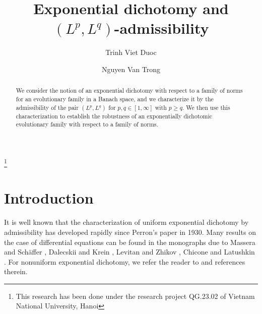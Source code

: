 \documentclass[reqno]{amsart}
\begin{document}
\title[Exponential dichotomy and admissibility]{Exponential dichotomy and $(L^p,L^q)$-admissibility} 
         
\thanks{This research has been done under the research project QG.23.02 of Vietnam National University, Hanoi}



\author{Trinh Viet Duoc}
\address{Trinh Viet Duoc,
Faculty of Mathematics, Mechanics, and Informatics\\ University of Science, Vietnam National University\\
334 Nguyen Trai, Hanoi, Vietnam; and 
 Thang Long Institute of Mathematics and Applied Sciences, Thang Long University, Nghiem Xuan Yem, Hanoi, Vietnam}

\author{Nguyen Van Trong}
\address{Nguyen Van Trong, Faculty of Mathematics, Mechanics, and Informatics\\ University of Science, Vietnam National University\\
334 Nguyen Trai, Hanoi, Vietnam}


\begin{abstract}
We consider the notion of an exponential dichotomy with respect to a family of norms for an evolutionary family in a Banach space, and we characterize it by the admissibility of the pair $(L^p,L^q)$ for $p,q \in [1,\infty]$ with $p\ge q$. We then use this characterization to establish the robustness of an exponentially dichotomic evolutionary family with respect to a family of norms.
\end{abstract} 

\maketitle

	
	
	\section{Introduction}

It is well known that the characterization of uniform exponential dichotomy by admissibility has developed rapidly since Perron's paper \cite{11} in 1930. Many results on the case of differential equations can be found in the monographs due to Massera and Sch\"{a}ffer \cite{10}, Dalecskii and Krein \cite{4}, Levitan and Zhikov \cite{9}, Chicone and Latushkin \cite{3}. For nonuniform exponential dichotomy, we refer the reader to \cite{1,2} and references therein.
\end{document}
